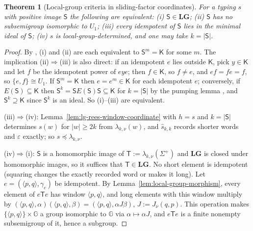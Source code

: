 \documentclass[11pt]{article}
\numberwithin{equation}{section}
\theoremstyle{plain}
\newtheorem{theorem}{Theorem}[section]
\theoremstyle{definition}
\theoremstyle{remark}
\newcommand{\eps}{\varepsilon}
\begin{document}
\begin{theorem}[Local-group criteria in sliding-factor coordinates]
\label{thm:lg-characterization}
For a typing $s$ with positive image $\mathsf S$ the following are equivalent:
\textup{(i)} $\mathsf S\in\mathbf{LG}$; \textup{(ii)} $\mathsf S$ has no subsemigroup isomorphic to
$U_1$; \textup{(iii)} every idempotent of $\mathsf S$ lies in the minimal ideal of $\mathsf S$;
\textup{(iv)} $s$ is local-group-determined, and one may take $k=|\mathsf S|$.
\end{theorem}

\begin{proof}
By \cite[Proposition~2.3, items (1), (3) and (4)]{AlmeidaEtAl2009}, (i) and (ii)
are each equivalent to $\mathsf S^m=\mathsf K$ for some $m$.  The implication
(ii)$\Rightarrow$(iii) is also direct: if an idempotent $e$ lies outside $\mathsf K$,
pick $y\in\mathsf K$ and let $f$ be the idempotent power of $eye$; then
$f\in\mathsf K$, so $f\ne e$, and $ef=fe=f$, so $\{e,f\}\cong U_1$.  If $\mathsf S^m=\mathsf K$ then $e=e^m\in\mathsf K$ for each
idempotent $e$; conversely, if $E(\mathsf S)\subseteq\mathsf K$ then
$\mathsf S^k=\mathsf S E(\mathsf S)\mathsf S\subseteq\mathsf K$ for $k=|\mathsf S|$ by the pumping lemma
\cite[Lemma~2.2]{AlmeidaEtAl2009}, and
$\mathsf S^k\supseteq\mathsf K$ since $\mathsf S^k$ is an ideal.  So (i)--(iii) are equivalent.

(iii)$\Rightarrow$(iv): Lemma~\ref{lem:lg-rees-window-coordinate} with
$h=s$ and $k=|\mathsf S|$ determines $s(w)$ for $|w|\ge2k$ from
$\lambda_{k,\nu}(w)$, and $\widehat s_{k,k}$ records shorter words and $\eps$ exactly;
so $\widehat s\preceq\lambda_{k,\nu}$.

(iv)$\Rightarrow$(i): $\mathsf S$ is a homomorphic image of $\mathsf T:=\lambda_{k,\nu}(\Sigma^+)$ and
$\mathbf{LG}$ is closed under homomorphic images, so it suffices that $\mathsf T\in\mathbf{LG}$.
No short element is idempotent (squaring changes the exactly recorded word or makes
it long).  Let $e=(\langle p,q\rangle,\gamma_e)$ be idempotent.  By
Lemma~\ref{lem:local-group-morphism}, every element of $e\mathsf Te$ has window
$\langle p,q\rangle$, and long elements with this window multiply by
$(\langle p,q\rangle,\alpha)(\langle p,q\rangle,\beta)=(\langle p,q\rangle,\alpha J\beta)$,
$J:=J_\nu(q,p)$.  This operation makes $\{\langle p,q\rangle\}\times {\mathbb G}$ a group
isomorphic to ${\mathbb G}$ via $\alpha\mapsto\alpha J$, and $e\mathsf Te$ is a finite nonempty
subsemigroup of it, hence a subgroup.
\end{proof}
\end{document}
